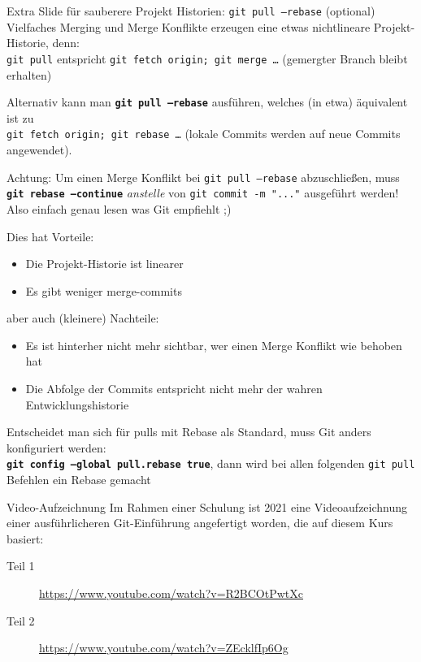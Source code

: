 \begin{frame}{Extra Slide für sauberere Projekt Historien: \texttt{git pull --rebase} (optional)}
    Vielfaches Merging und Merge Konflikte erzeugen eine etwas nichtlineare Projekt-Historie, denn:\\
    \texttt{git pull} entspricht \texttt{git fetch origin; git merge …} (\to\;gemergter Branch bleibt erhalten)

    Alternativ kann man \texttt{\textbf{git pull --rebase}} ausführen, welches (in etwa) äquivalent ist zu\\\texttt{git fetch origin; git rebase …} (\to\;lokale Commits werden auf neue Commits angewendet).

    {\color{red} Achtung: Um einen Merge Konflikt bei \texttt{git pull --rebase} abzuschließen, muss \texttt{\textbf{git~rebase~--continue}} \emph{anstelle} von \texttt{git commit -m "..."} ausgeführt werden! Also einfach genau lesen was Git empfiehlt ;)}

    Dies hat Vorteile:
    \begin{itemize}
        \item Die Projekt-Historie ist linearer
        \item Es gibt weniger merge-commits
    \end{itemize}
    aber auch (kleinere) Nachteile:
    \begin{itemize}
        \item Es ist hinterher nicht mehr sichtbar, wer einen Merge Konflikt wie behoben hat
        \item Die Abfolge der Commits entspricht nicht mehr der wahren Entwicklungshistorie
    \end{itemize}
    Entscheidet man sich für pulls mit Rebase als Standard, muss Git anders konfiguriert werden:\\
    \texttt{\textbf{git config --global pull.rebase true}}, dann wird bei allen folgenden \texttt{git pull} Befehlen ein Rebase gemacht
\end{frame}

\begin{frame}{Video-Aufzeichnung}
  Im Rahmen einer Schulung ist 2021 eine Videoaufzeichnung einer ausführlicheren Git-Einführung angefertigt worden, die auf diesem Kurs basiert:

  \begin{description}
    \item[Teil 1] \url{https://www.youtube.com/watch?v=R2BCOtPwtXc}
    \item[Teil 2] \url{https://www.youtube.com/watch?v=ZEcklfIp6Og}
  \end{description}
\end{frame}

